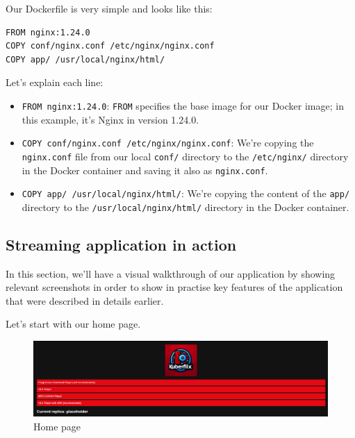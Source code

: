 \documentclass{article}
\begin{document}
Our Dockerfile is very simple and looks like this:

\begin{verbatim}
FROM nginx:1.24.0
COPY conf/nginx.conf /etc/nginx/nginx.conf
COPY app/ /usr/local/nginx/html/
\end{verbatim}

Let's explain each line:

\begin{itemize}
    \item \texttt{FROM nginx:1.24.0}: \texttt{FROM} specifies the base image for our Docker image; in this example, it's Nginx in version 1.24.0.
    
    \item \texttt{COPY conf/nginx.conf /etc/nginx/nginx.conf}: We're copying the \texttt{nginx.conf} file from our local \texttt{conf/} directory to the \texttt{/etc/nginx/} directory in the Docker container and saving it also as \texttt{nginx.conf}.
    
    \item \texttt{COPY app/ /usr/local/nginx/html/}: We're copying the content of the \texttt{app/} directory to the 
    \newline\texttt{/usr/local/nginx/html/} directory in the Docker container.
\end{itemize}


\subsection{Streaming application in
action}\label{streaming-application-in-action}

In this section, we'll have a visual walkthrough of our application by
showing relevant screenshots in order to show in practise key features
of the application that were described in details earlier.

Let's start with our home page.

\begin{figure}[H]
\centering
\includegraphics[width=\textwidth]{images/1_home_page.png}
\caption{Home page}
\end{figure}
\end{document}
